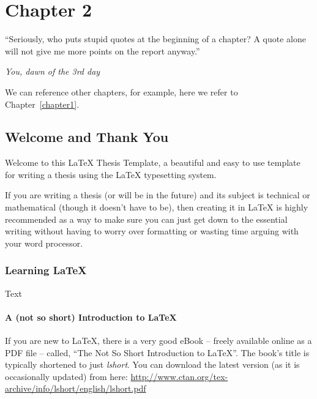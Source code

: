 
\chapter{Chapter 2} %

\label{chapter2} %

\epigraph{``Seriously, who puts stupid quotes at the beginning of a chapter? A quote alone will not give me more points on the report anyway.''}{\textit{You, dawn of the 3rd day}}

We can reference other chapters, for example, here we refer to Chapter~\ref{chapter1}.

\section{Welcome and Thank You}
Welcome to this \LaTeX{} Thesis Template, a beautiful and easy to use template for writing a thesis using the \LaTeX{} typesetting system.

If you are writing a thesis (or will be in the future) and its subject is technical or mathematical (though it doesn't have to be), then creating it in \LaTeX{} is highly recommended as a way to make sure you can just get down to the essential writing without having to worry over formatting or wasting time arguing with your word processor.

\subsection{Learning \LaTeX{}}
Text

\subsubsection{A (not so short) Introduction to \LaTeX{}}

If you are new to \LaTeX{}, there is a very good eBook -- freely available online as a PDF file -- called, \enquote{The Not So Short Introduction to \LaTeX{}}. The book's title is typically shortened to just \emph{lshort}.
You can download the latest version (as it is occasionally updated) from here:
\url{http://www.ctan.org/tex-archive/info/lshort/english/lshort.pdf}
